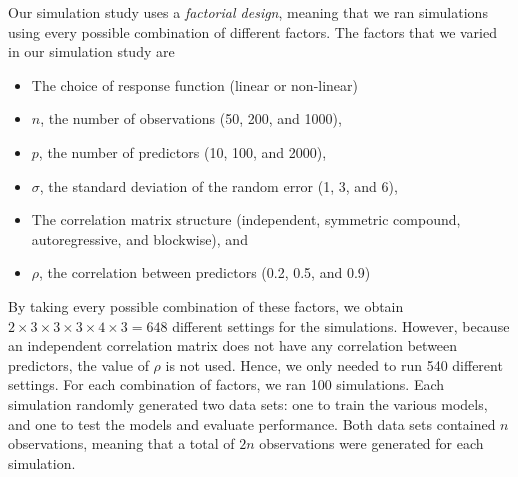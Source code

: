 \documentclass{article}
\begin{document}

	
	Our simulation study uses a \textit{factorial design}, meaning that we ran simulations using every possible combination of different factors. The factors that we varied in our simulation study are
	\begin{itemize}\itemsep0pt
		\item The choice of response function (linear or non-linear)
		\item $n$, the number of observations (50, 200, and 1000),
		\item $p$, the number of predictors (10, 100, and 2000),
		\item $\sigma$, the standard deviation of the random error (1, 3, and 6),
		\item The correlation matrix structure (independent, symmetric compound, autoregressive, and blockwise), and
		\item $\rho$, the correlation between predictors (0.2, 0.5, and 0.9)
	\end{itemize}
	
	By taking every possible combination of these factors, we obtain $2\times 3\times 3\times 3\times 4\times 3 = 648$ different settings for the simulations. However, because an independent correlation matrix does not have any correlation between predictors, the value of $\rho$ is not used. Hence, we only needed to run 540 different settings. For each combination of factors, we ran 100 simulations. Each simulation randomly generated two data sets: one to train the various models, and one to test the models and evaluate performance. Both data sets contained $n$ observations, meaning that a total of $2n$ observations were generated for each simulation.
	
\end{document}

